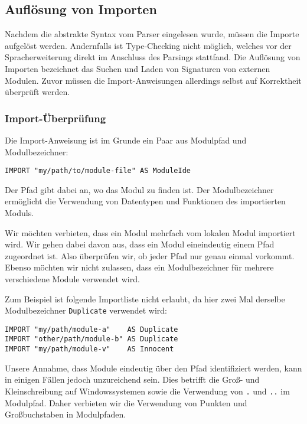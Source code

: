 \documentclass[runningheads]{llncs}
\begin{document}
\subsection{Auflösung von Importen}
\label{sec:imports}

Nachdem die abstrakte Syntax vom Parser eingelesen wurde, müssen die Importe aufgelöst werden. Andernfalls ist Type-Checking nicht möglich, welches vor der Spracherweiterung direkt im Anschluss des Parsings stattfand. Die Auflösung von Importen bezeichnet das Suchen und Laden von Signaturen von externen Modulen. Zuvor müssen die Import-Anweisungen allerdings selbst auf Korrektheit überprüft werden.

\subsubsection{Import-Überprüfung}
\label{sec:semanticsimports}

Die Import-Anweisung ist im Grunde ein Paar aus Modulpfad und Modulbezeichner:

\begin{verbatim}
IMPORT "my/path/to/module-file" AS ModuleIde
\end{verbatim}

Der Pfad gibt dabei an, wo das Modul zu finden ist. Der Modulbezeichner ermöglicht die Verwendung von Datentypen und Funktionen des importierten Moduls.

Wir möchten verbieten, dass ein Modul mehrfach vom lokalen Modul importiert wird. Wir gehen dabei davon aus, dass ein Modul eineindeutig einem Pfad zugeordnet ist. Also überprüfen wir, ob jeder Pfad nur genau einmal vorkommt. Ebenso möchten wir nicht zulassen, dass ein Modulbezeichner für mehrere verschiedene Module verwendet wird.

Zum Beispiel ist folgende Importliste nicht erlaubt, da hier zwei Mal derselbe Modulbezeichner \verb|Duplicate| verwendet wird:

\begin{verbatim}
IMPORT "my/path/module-a"    AS Duplicate
IMPORT "other/path/module-b" AS Duplicate
IMPORT "my/path/module-v"    AS Innocent
\end{verbatim}

Unsere Annahme, dass Module eindeutig über den Pfad identifiziert werden, kann in einigen Fällen jedoch unzureichend sein. Dies betrifft die Groß- und Kleinschreibung auf Windowssystemen sowie die Verwendung von \texttt{.} und \texttt{..} im Modulpfad. Daher verbieten wir die Verwendung von Punkten und Großbuchstaben in Modulpfaden.
\end{document}
